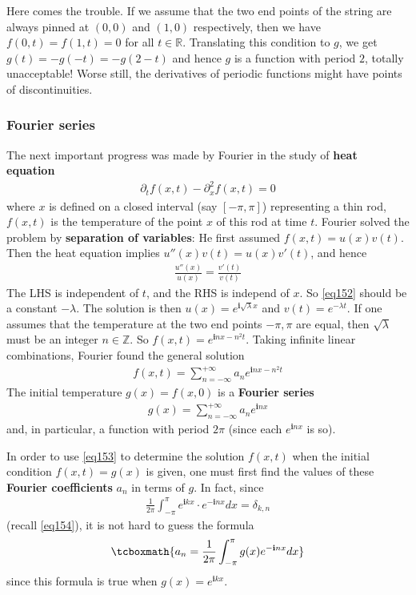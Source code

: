 \documentclass[12pt,b5paper,notitlepage]{article}
\theoremstyle{definition}
\theoremstyle{plain}
\newcommand{\im}{\mathbf{i}}
\newcommand{\Zbb}{\mathbb Z}
\newcommand{\Rbb}{\mathbb R}
\numberwithin{equation}{section}
\begin{document}
Here comes the trouble. If we assume that the two end points of the string are always pinned at $(0,0)$ and $(1,0)$ respectively, then we have $f(0,t)=f(1,t)=0$ for all $t\in\Rbb$. Translating this condition to $g$, we get $g(t)=-g(-t)=-g(2-t)$ and hence $g$ is a function with period $2$, totally unacceptable! Worse still, the derivatives of periodic functions might have points of discontinuities.

\subsubsection{Fourier series}


The next important progress was made by Fourier in the study of \textbf{heat equation}
\begin{align}
\partial_t f(x,t)-\partial_x^2 f(x,t)=0
\end{align}
where $x$ is defined on a closed interval (say $[-\pi,\pi]$) representing a thin rod, $f(x,t)$ is the temperature   of the point $x$ of this rod at time $t$. Fourier solved the problem by \textbf{separation of variables}: He first assumed $f(x,t)=u(x)v(t)$. Then the heat equation implies $u''(x)v(t)=u(x)v'(t)$, and hence
\begin{align}
\frac{u''(x)}{u(x)}=\frac{v'(t)}{v(t)}  \label{eq152}
\end{align}
The LHS is independent of $t$, and the RHS is independ of $x$. So \eqref{eq152} should be a constant $-\lambda$. The solution is then $u(x)=e^{\im\sqrt\lambda x}$ and $v(t)=e^{-\lambda t}$. If one assumes that the temperature at the two end points $-\pi,\pi$ are equal, then $\sqrt\lambda$ must be an integer $n\in\Zbb$. So $f(x,t)=e^{\im nx-n^2t}$. Taking infinite linear combinations, Fourier found the general solution
\begin{align}
f(x,t)=\sum_{n=-\infty}^{+\infty} a_n e^{\im nx-n^2t}  \label{eq153}
\end{align}
The initial temperature $g(x)=f(x,0)$ is a \textbf{Fourier series}
\begin{align}
g(x)=\sum_{n=-\infty}^{+\infty} a_n e^{\im nx} \label{eq156}
\end{align}
and, in particular, a function with period $2\pi$ (since each $e^{\im nx}$ is so). 

In order to use \eqref{eq153} to determine the solution $f(x,t)$ when the initial condition $f(x,t)=g(x)$ is given, one must first find the values of these \textbf{Fourier coefficients} $a_n$ in terms of $g$. In fact, since 
\begin{align}
\frac 1{2\pi}\int_{-\pi}^\pi e^{\im kx}\cdot e^{-\im nx}dx=\delta_{k,n}
\end{align}
(recall \eqref{eq154}), it is not hard to guess the formula
\begin{align}
\tcboxmath{a_n=\frac 1{2\pi}\int_{-\pi}^\pi g(x)e^{-\im nx}dx}  \label{eq155}
\end{align}
since this formula is true when $g(x)=e^{\im kx}$.
\end{document}
